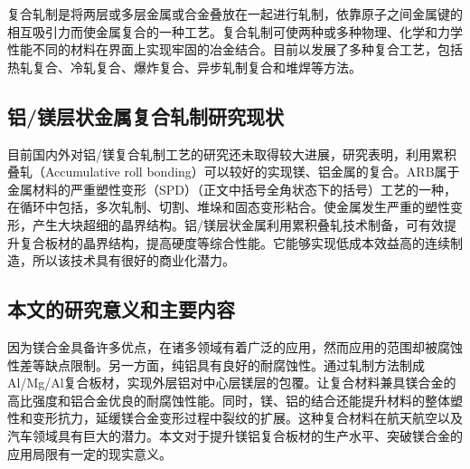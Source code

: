 复合轧制是将两层或多层金属或合金叠放在一起进行轧制，依靠原子之间金属键的相互吸引力而使金属复合的一种工艺。复合轧制可使两种或多种物理、化学和力学性能不同的材料在界面上实现牢固的冶金结合。目前以发展了多种复合工艺，包括热轧复合、冷轧复合、爆炸复合、异步轧制复合和堆焊等方法。\par
\subsection{铝/镁层状金属复合轧制研究现状}

目前国内外对铝/镁复合轧制工艺的研究还未取得较大进展，研究表明，利用累积叠轧（Accumulative roll bonding）可以较好的实现镁、铝金属的复合。ARB属于金属材料的严重塑性变形（SPD）（正文中括号全角状态下的括号）工艺的一种，在循环中包括，多次轧制、切割、堆垛和固态变形粘合。使金属发生严重的塑性变形，产生大块超细的晶界结构。铝/镁层状金属利用累积叠轧技术制备，可有效提升复合板材的晶界结构，提高硬度等综合性能。它能够实现低成本效益高的连续制造，所以该技术具有很好的商业化潜力。\par
\subsection{本文的研究意义和主要内容}

因为镁合金具备许多优点，在诸多领域有着广泛的应用，然而应用的范围却被腐蚀性差等缺点限制。另一方面，纯铝具有良好的耐腐蚀性。通过轧制方法制成Al/Mg/Al复合板材，实现外层铝对中心层镁层的包覆。让复合材料兼具镁合金的高比强度和铝合金优良的耐腐蚀性能。同时，镁、铝的结合还能提升材料的整体塑性和变形抗力，延缓镁合金变形过程中裂纹的扩展。这种复合材料在航天航空以及汽车领域具有巨大的潜力。本文对于提升镁铝复合板材的生产水平、突破镁合金的应用局限有一定的现实意义。\par

\clearpage